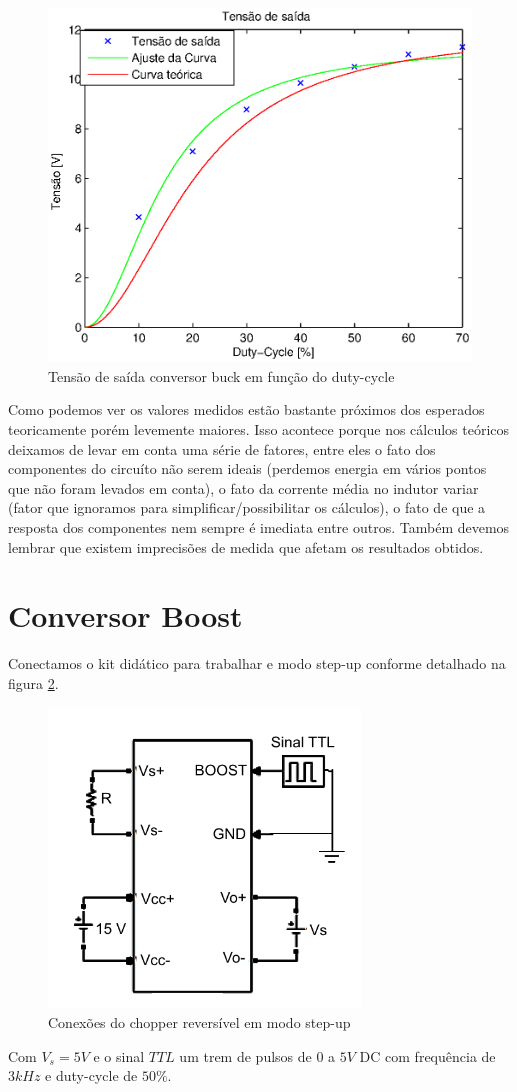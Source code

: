 \documentclass{article}
\begin{document}
\begin{figure}[H]
	\centering
	\includegraphics[width=0.7\linewidth]{Dados/buck/tvd}
	\caption{Tensão de saída conversor buck em função do duty-cycle}
	\label{fig:butvd}
\end{figure}

Como podemos ver os valores medidos estão bastante próximos dos esperados teoricamente porém levemente maiores. Isso acontece porque nos cálculos teóricos deixamos de levar em conta uma série de fatores, entre eles o fato dos componentes do circuíto não serem ideais (perdemos energia em vários pontos que não foram levados em conta), o fato da corrente média no indutor variar (fator que ignoramos para simplificar/possibilitar os cálculos), o fato de que a resposta dos componentes nem sempre é imediata entre outros. Também devemos lembrar que existem imprecisões de medida que afetam os resultados obtidos.


\section{Conversor Boost}

Conectamos o kit didático para trabalhar e modo step-up conforme detalhado na figura \ref{fig:boesq}.
\begin{figure}[H]
	\centering
	\includegraphics[width=0.5\linewidth]{Dados/boost/esq}
	\caption{Conexões do chopper reversível em modo step-up \cite{bb:paiva}}
	\label{fig:boesq}
\end{figure}
Com $V_s = 5V$ e o sinal $TTL$ um trem de pulsos de $0$ a $5V$ DC com frequência de $3kHz$ e duty-cycle de $50\%$.
\end{document}
